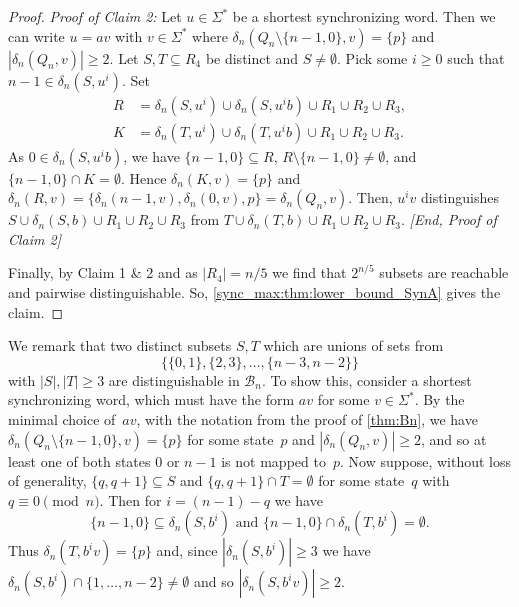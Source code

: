 \begin{proof}
	\medskip 
	\noindent\emph{Proof of Claim 2:} Let $u \in \Sigma^*$ be a shortest synchronizing word. %
	Then we can write $u = av$ with $v \in \Sigma^*$
	where $\delta_n(Q_n \setminus \{n-1,0\}, v) = \{ p \}$
	and $|\delta_n(Q_n, v)| \ge 2$.
	Let $S, T \subseteq R_4$ be distinct
	and $S \ne \emptyset$.
	Pick some $i \ge 0$
	such that $n - 1 \in \delta_n(S, u^i)$.
	Set
	\begin{align*}
	R & = \delta_n(S, u^i) \cup \delta_n(S, u^ib) \cup R_1 \cup R_2 \cup R_3, \\
	K & = \delta_n(T, u^i) \cup \delta_n(T, u^ib) \cup R_1 \cup R_2 \cup R_3.
	\end{align*}
 	As $0 \in \delta_n(S, u^ib)$,
 	we have $\{n - 1, 0\} \subseteq R$, $R \setminus \{n-1,0\} \ne \emptyset$,
 	and $\{n - 1, 0\} \cap K = \emptyset$.
	Hence $\delta_n(K, v) = \{p\}$
	and $\delta_n(R, v) = \{\delta_n(n-1, v), \delta_n(0, v), p\} = \delta_n(Q_n, v)$.
	Then, $u^iv$  distinguishes 
	$
	S \cup \delta_n(S, b) \cup R_1 \cup R_2 \cup R_3
	$
	from 
	$
	T \cup \delta_n(T, b) \cup R_1 \cup R_2 \cup R_3.
	$
	\emph{[End, Proof of Claim 2]}
	
	\medskip
	
	Finally, by Claim 1 \& 2 and as $|R_4| = n / 5$
	we find that $2^{n/5}$ subsets are reachable and pairwise
	distinguishable. So,
	\cref{sync_max:thm:lower_bound_SynA} 
	gives the claim. 
\end{proof} 

\begin{remark}
	We remark that two distinct subsets $S, T$ 
	which are unions of sets from 
	\[
	\{ \{0,1\}, \{2,3\}, \ldots, \{n-3,n-2\}\}
	\]
	with $|S|, |T| \ge 3$ are distinguishable in $\mathcal B_n$.
	To show this, consider a shortest synchronizing
	word, which must have the form $av$ for some $v \in \Sigma^*$.
	By the minimal choice of~$av$, 
	with the notation from the proof of \cref{thm:Bn},
	we have $\delta_n(Q_n \setminus \{n - 1, 0\}, v) = \{p\}$ for some state~$p$
	and $|\delta_n(Q_n, v)| \ge 2$,
	and so at least one of both states $0$ or $n-1$
	is not mapped to~$p$.	
    Now suppose, without loss of generality,
    $\{q,q+1\} \subseteq S$
    and $\{q, q+1\} \cap T = \emptyset$
    for some state~$q$ with $q \equiv 0 \pmod{n}$.
    Then for $i = (n - 1) - q$ we have
    \[
    \{n-1, 0\} \subseteq \delta_n(S, b^i) \text{ and }
    \{n-1, 0\} \cap      \delta_n(T, b^i) = \emptyset.
    \]
    Thus $\delta_n(T, b^iv) = \{p\}$
    and, since $|\delta_n(S, b^i)| \ge 3$ 
    we have $\delta_n(S, b^i) \cap \{1,\ldots,n-2\} \ne \emptyset$
    and so $|\delta_n(S, b^iv)| \ge 2$.
\end{remark}

